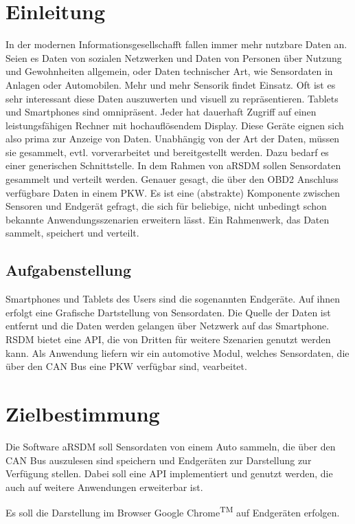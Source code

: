 \documentclass[pflichtenheft.tex]{subfiles}
\begin{document}
\chapter{Einleitung}

In der modernen Informationsgesellschafft fallen immer mehr nutzbare Daten an. Seien es Daten von sozialen Netzwerken und Daten von Personen über Nutzung und Gewohnheiten allgemein, oder Daten technischer Art, wie Sensordaten in Anlagen oder Automobilen. Mehr und mehr Sensorik findet Einsatz. Oft ist es sehr interessant diese Daten auszuwerten und visuell zu repräsentieren. Tablets und Smartphones sind omnipräsent. Jeder hat dauerhaft Zugriff auf einen leistungsfähigen Rechner mit hochauflösendem Display. Diese Geräte eignen sich also prima zur Anzeige von Daten. Unabhängig von der Art der Daten, müssen sie gesammelt, evtl. vorverarbeitet und bereitgestellt werden. Dazu bedarf es einer generischen Schnittstelle. In dem Rahmen von aRSDM sollen Sensordaten gesammelt und verteilt werden. Genauer gesagt, die über den OBD2 Anschluss verfügbare Daten in einem PKW. Es ist eine (abstrakte) Komponente zwischen Sensoren und Endgerät gefragt, die sich für beliebige, nicht unbedingt schon bekannte Anwendungsszenarien erweitern lässt. Ein Rahmenwerk, das Daten sammelt, speichert und verteilt.

\section{Aufgabenstellung}

Smartphones und Tablets des Users sind die sogenannten Endgeräte. Auf ihnen erfolgt eine Grafische Dartstellung von Sensordaten. Die Quelle der Daten ist entfernt und die Daten werden gelangen über Netzwerk auf das Smartphone. RSDM bietet eine API, die von Dritten für weitere Szenarien genutzt werden kann. Als Anwendung liefern wir ein automotive Modul, welches Sensordaten, die über den CAN Bus eine PKW verfügbar sind, vearbeitet.


\chapter{Zielbestimmung}

Die Software aRSDM soll Sensordaten von einem Auto sammeln, die über den CAN Bus auszulesen sind speichern und Endgeräten zur Darstellung zur Verfügung stellen. Dabei soll eine API implementiert und genutzt werden, die auch auf weitere Anwendungen erweiterbar ist.

Es soll die Darstellung im Browser Google Chrome\textsuperscript{TM} auf Endgeräten erfolgen. 
\end{document}
